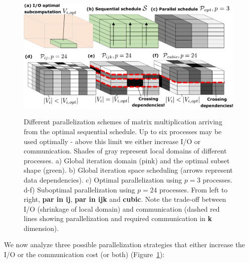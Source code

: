 \documentclass[sigplan,review,anonymous]{acmart}\settopmatter{printfolios=true,printccs=false,printacmref=false}
\begin{document}
\begin{figure}
  \includegraphics[width=\columnwidth]{figures/mmm_parallelization}
  \label{fig:mmmParallelization}
  \caption{Different parallelization schemes of matrix multiplication 
    arriving from the optimal sequential schedule. Up to six processes may 
    be 
    used optimally - above this limit we either increase I/O or 
    communication. 
    Shades of gray represent local domains of different processes. a) 
    Global 
    iteration domain (pink) and the optimal subset shape (green). b) Global 
    iteration space scheduling (arrows represent data dependencies). c) 
    Optimal 
    parallelization using $p=3$ processes. d-f) Suboptimal parallelization 
    using $p=24$ processes. From left to right, \textbf{par in ij}, 
    \textbf{par 
      in ijk} and \textbf{cubic}. Note the trade-off between I/O 
      (shrinkage of 
    local domain) and communication (dashed red lines showing 
    parallelization 
    and required communication in \textbf{k} dimension).} 
\end{figure}

We now analyze three possible parallelization strategies that either increase 
the I/O or the communication cost (or both) 
(Figure~\ref{fig:mmmParallelization}):
\end{document}
